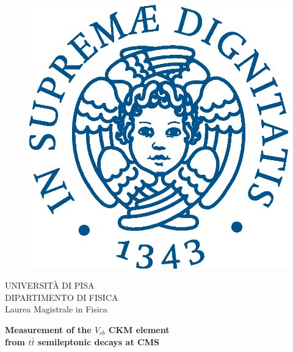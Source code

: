 
\begin{titlepage}

    \begin{figure}[!htb]
        \centering
        \includegraphics[keepaspectratio=true,scale=0.5]{fig/Frontespizio/cherubinFrontespizio.eps}
    \end{figure}


\begin{center}
    \LARGE{UNIVERSITÀ DI PISA}
    \vspace{5mm}
    \\ \large{DIPARTIMENTO DI FISICA}
    \vspace{5mm}
    \\ \LARGE{Laurea Magistrale in Fisica}
\end{center}

\vspace{15mm}
\begin{center}
    {\LARGE{\textbf{Measurement of the $V_{cb}$ CKM element}\\ \vspace{5mm} \textbf{from $t\bar{t}$ semileptonic decays at CMS} }}
    
    

\end{center}
\end{titlepage}
